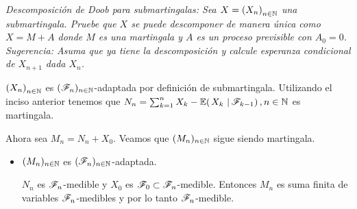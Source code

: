 \emph{
    Descomposici\'on de Doob para submartingalas: Sea $X=\left( X_n\right) _{n\in\mathbb{N}}$ una submartingala. 
    Pruebe que $X$ se puede descomponer de manera \'unica como $X=M+A$ donde $M$ es una martingala y $A$ 
    es un proceso previsible con $A_0=0$. Sugerencia: Asuma que ya tiene la descomposici\'on y calcule 
    esperanza condicional de $X_{n+1}$ dada $X_n$. 
}

\afterstatement\par\null

$\left( X_n\right) _{n\in\mathbb{N}}$ es $(\mathscr{F}_n)_{n \in \mathbb{N}}$-adaptada por definición de submartingala. Utilizando el inciso anterior tenemos
que $N_n = \sum_{k=1}^n X_k-\espc{X_k}{\F_{k-1}}, n \in \N$ es martingala.\par\null

Ahora sea $M_n = N_n + X_0$. Veamos que $(M_n)_{n \in \mathbb{N}}$ sigue siendo martingala.

\begin{itemize}
	\item $(M_n)_{n \in \mathbb{N}}$ es $(\mathscr{F}_n)_{n \in \mathbb{N}}$-adaptada.\par\null
    
    $N_n$ es $\mathscr{F}_n$-medible y $X_0$ es $\mathscr{F}_0 \subset \mathscr{F}_n$-medible. Entonces $M_n$ es suma
    finita de variables $\mathscr{F}_n$-medibles y por lo tanto $\mathscr{F}_n$-medible.
\end{itemize}
